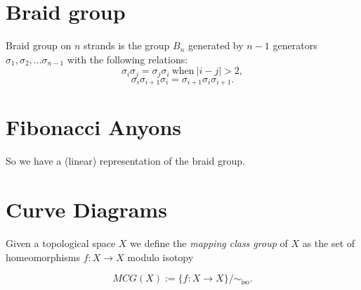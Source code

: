 \documentclass[12pt,a4paper]{article}
\begin{document}
\maketitle

\def\Complex {C}
\def\tensor{\otimes}
\def\Tensor{\bigotimes}
\def\bra #1{\langle #1|}
\def\ket #1{|#1\rangle}
\def\braket #1#2{\langle #1|#2 \rangle}



\def\mathZ{\mathbb{Z}}
\def\mathR{\mathbb{R}}



%

\section{Braid group}

Braid group on $n$ strands is the group $B_n$ generated by $n-1$ generators
$\sigma_1, \sigma_2, ... \sigma_{n-1}$ with the following relations:
    $$ \sigma_i \sigma_j = \sigma_j \sigma_i \ \text{when}\ |i-j| > 2, $$
    $$ \sigma_i \sigma_{i+1} \sigma_i =  \sigma_{i+1} \sigma_i \sigma_{i+1}.$$



\section{Fibonacci Anyons}


So we have a (linear) representation of the braid group.



\section{Curve Diagrams}


Given a topological space $X$ we define the {\it mapping class group} of $X$ as
the set of homeomorphisms $f:X\to X$ modulo isotopy

    $$ MCG(X) := \{ f : X \to X \} / \sim_{\text{iso}}.$$
\end{document}
